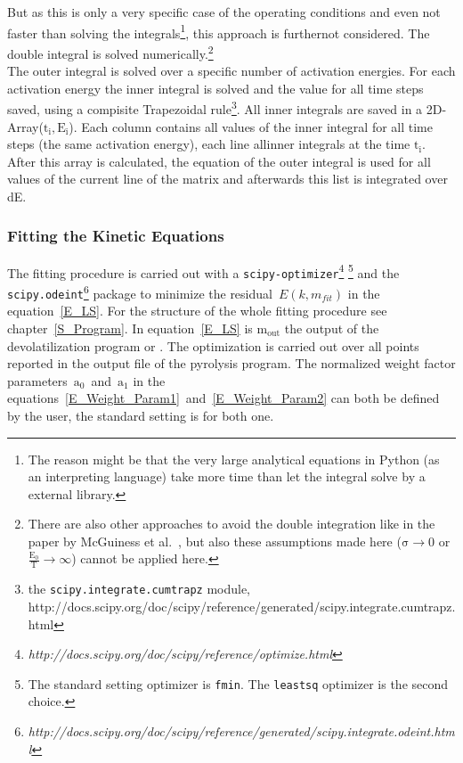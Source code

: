  But as this is only a very specific case of the operating conditions and even not faster than solving the integrals\footnote{The reason might be that the very large analytical equations in Python (as an interpreting language) take more time than let the integral solve by a external library.}, this approach is furthernot considered. The double integral is solved numerically.\footnote{There are also other approaches to avoid the double integration like in the paper by McGuiness et al.~\cite{McGuiness_DAEM}, but also these assumptions made here ($\mathrm{\sigma \rightarrow 0 }$ or $\mathrm{\frac{E_0}{T} \rightarrow \infty }$) cannot be applied here.}\\
The outer integral is solved over a specific number of activation energies. For each activation energy the inner integral is solved and the value for all time steps saved, using a compisite Trapezoidal rule\footnote{the \texttt{scipy.integrate.cumtrapz} module, http://docs.scipy.org/doc/scipy/reference/generated/scipy.integrate.cumtrapz.html}. All inner integrals are saved in a 2D-Array($\mathrm{t_i,E_i}$). Each column contains all values of the inner integral for all time steps (the same activation energy), each line allinner integrals at the time $\mathrm{t_i}$. After this array is calculated, the equation of the outer integral is used for all values of the current line of the matrix and afterwards this list is integrated over dE.



\subsubsection{Fitting the Kinetic Equations}\label{SSS_FitKin}
The fitting procedure is carried out with a \texttt{scipy-optimizer}\footnote{\textit{http://docs.scipy.org/doc/scipy/reference/optimize.html}} \footnote{The standard setting optimizer is \texttt{fmin}.  The \texttt{leastsq} optimizer is the second choice.} and the \texttt{scipy.odeint}\footnote{\textit{http://docs.scipy.org/doc/scipy/reference/generated/scipy.integrate.odeint.html}} package to minimize the residual~$E(k,m_{fit})$ in the equation~\ref{E_LS}. For the structure of the whole fitting procedure see chapter~\ref{S_Program}. In equation~\ref{E_LS} is $\mathrm{m_{out}}$ the output of the devolatilization program \CPD or \FGDVC. The optimization is carried out over all points reported in the output file of the pyrolysis program. The normalized weight factor parameters~$\mathrm{a_0}$~and~$\mathrm{a_1}$ in the equations~\ref{E_Weight_Param1}~and~\ref{E_Weight_Param2} can both be defined by the user, the standard setting is for both one.

